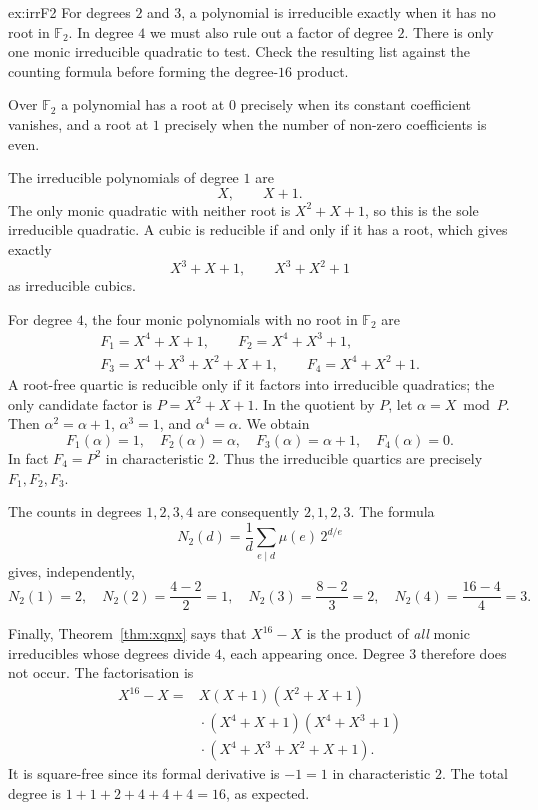\begin{solution}{ex:irrF2}
\idea For degrees $2$ and $3$, a polynomial is irreducible exactly when it has no root in $\mathbb F_2$. In degree $4$ we must also rule out a factor of degree $2$. There is only one monic irreducible quadratic to test. Check the resulting list against the counting formula before forming the degree-$16$ product.

\writeup Over $\mathbb F_2$ a polynomial has a root at $0$ precisely when its constant coefficient vanishes, and a root at $1$ precisely when the number of non-zero coefficients is even.

The irreducible polynomials of degree $1$ are
\[
X,\qquad X+1.
\]
The only monic quadratic with neither root is $X^2+X+1$, so this is the sole irreducible quadratic. A cubic is reducible if and only if it has a root, which gives exactly
\[
X^3+X+1,\qquad X^3+X^2+1
\]
as irreducible cubics.

For degree $4$, the four monic polynomials with no root in $\mathbb F_2$ are
\[
\begin{gathered}
F_1=X^4+X+1,\qquad F_2=X^4+X^3+1,\\
F_3=X^4+X^3+X^2+X+1,\qquad
F_4=X^4+X^2+1.
\end{gathered}
\]
A root-free quartic is reducible only if it factors into irreducible quadratics; the only candidate factor is $P=X^2+X+1$. In the quotient by $P$, let $\alpha=X\bmod P$. Then $\alpha^2=\alpha+1$, $\alpha^3=1$, and $\alpha^4=\alpha$. We obtain
\[
F_1(\alpha)=1,\quad
F_2(\alpha)=\alpha,\quad
F_3(\alpha)=\alpha+1,\quad
F_4(\alpha)=0.
\]
In fact $F_4=P^2$ in characteristic $2$. Thus the irreducible quartics are precisely $F_1,F_2,F_3$.

The counts in degrees $1,2,3,4$ are consequently $2,1,2,3$. The formula
\[
N_2(d)=\frac1d\sum_{e\mid d}\mu(e)\,2^{d/e}
\]
gives, independently,
\[
N_2(1)=2,\quad N_2(2)=\frac{4-2}{2}=1,\quad
N_2(3)=\frac{8-2}{3}=2,\quad
N_2(4)=\frac{16-4}{4}=3.
\]

Finally, Theorem~\ref{thm:xqnx} says that $X^{16}-X$ is the product of \emph{all} monic irreducibles whose degrees divide $4$, each appearing once. Degree $3$ therefore does not occur. The factorisation is
\[
\begin{aligned}
X^{16}-X={}&X(X+1)(X^2+X+1)\\
&{}\cdot(X^4+X+1)(X^4+X^3+1)\\
&{}\cdot(X^4+X^3+X^2+X+1).
\end{aligned}
\]
It is square-free since its formal derivative is $-1=1$ in characteristic $2$. The total degree is $1+1+2+4+4+4=16$, as expected.
\end{solution}

